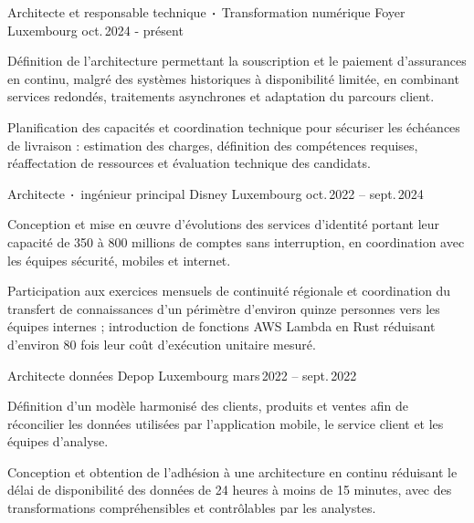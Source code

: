 
\begin{cventries}
    \cventry
    {Architecte et responsable technique$\sqbig$Transformation numérique} %
    {Foyer} %
    {Luxembourg} %
    {oct.\,2024 - présent} %
    {
        \begin{cvitems} %
            \item {Définition de l’architecture permettant la souscription et le paiement d’assurances en continu, malgré des systèmes historiques à disponibilité limitée, en combinant services redondés, traitements asynchrones et adaptation du parcours client.}
            \item {Planification des capacités et coordination technique pour sécuriser les échéances de livraison : estimation des charges, définition des compétences requises, réaffectation de ressources et évaluation technique des candidats.}
        \end{cvitems}
    }
%

    \cventry
    {Architecte$\sqbig$ingénieur principal}
    {Disney}
    {Luxembourg}
    {oct.\,2022 -- sept.\,2024}
    {
        \begin{cvitems}
            \item {Conception et mise en œuvre d’évolutions des services d’identité portant leur capacité de 350 à 800 millions de comptes sans interruption, en coordination avec les équipes sécurité, mobiles et internet.}
            \item {Participation aux exercices mensuels de continuité régionale et coordination du transfert de connaissances d’un périmètre d’environ quinze personnes vers les équipes internes ; introduction de fonctions AWS Lambda en Rust réduisant d’environ 80 fois leur coût d’exécution unitaire mesuré.}
        \end{cvitems}
    }

    \cventry
    {Architecte données}
    {Depop}
    {Luxembourg}
    {mars\,2022 -- sept.\,2022}
    {
        \begin{cvitems}
            \item {Définition d’un modèle harmonisé des clients, produits et ventes afin de réconcilier les données utilisées par l’application mobile, le service client et les équipes d’analyse.}
            \item {Conception et obtention de l’adhésion à une architecture en continu réduisant le délai de disponibilité des données de 24 heures à moins de 15 minutes, avec des transformations compréhensibles et contrôlables par les analystes.}
        \end{cvitems}
    }


\end{cventries}

